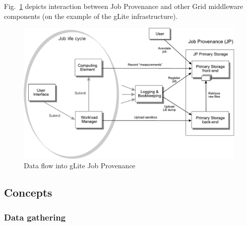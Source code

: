 Fig.~\ref{fig:psinter} depicts interaction between Job Provenance and
other Grid middleware components (on the example of the gLite
infrastructure).
\begin{figure}[ht]
  \centering
  \includegraphics[scale=0.5]{images/JP-interactions}
  \caption{Data flow into gLite Job Provenance}
  \label{fig:psinter}
\end{figure}

\subsection{Concepts}

\subsubsection{Data gathering}%
\label{data}


